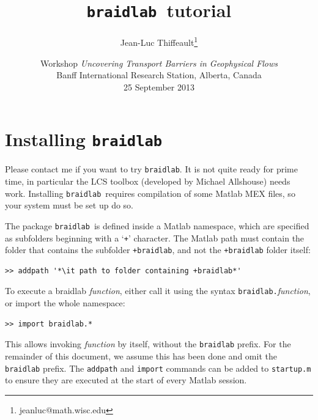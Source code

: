 \documentclass[12pt]{article}
\newcommand{\braidlab}{\texttt{braidlab}}%
\begin{document}
\lstset{language=Matlab}
\lstset{breaklines=true}

\lstset{%
basicstyle=\small\ttfamily,
keywordstyle=\small\ttfamily,
identifierstyle=,
commentstyle=\small\rmfamily\itshape,%
stringstyle=\small\ttfamily,
showstringspaces=false}


\title{\braidlab\ tutorial}
\author{Jean-Luc Thiffeault\thanks{jeanluc@math.wisc.edu}}
\date{Workshop {\it Uncovering Transport Barriers in Geophysical Flows}\\[2pt]
  Banff International Research Station, Alberta, Canada \\[4pt] 25 September 2013}
\maketitle

\section{Installing \braidlab}

Please contact me if you want to try \braidlab.  It is not quite ready for
prime time, in particular the LCS toolbox (developed by Michael Allshouse)
needs work.  Installing \braidlab\ requires compilation of some Matlab MEX
files, so your system must be set up do so.

The package \braidlab\ is defined inside a Matlab namespace, which are
specified as subfolders beginning with a `\lstinline{+}' character.  The Matlab
path must contain the folder that contains the subfolder
\lstinline{+braidlab}, and not the \lstinline{+braidlab} folder
itself:
\begin{lstlisting}[frame=single,framerule=0pt,escapechar=*]
>> addpath '*\it path to folder containing +braidlab*'
\end{lstlisting}
To execute a braidlab \textit{function}, either call it using the
syntax \hbox{\lstinline{braidlab.}\textit{function}}, or import the
whole namespace:
\begin{lstlisting}[frame=single,framerule=0pt]
>> import braidlab.*
\end{lstlisting}
This allows invoking \textit{function} by itself, without the
\lstinline{braidlab} prefix.  For the remainder of this document, we
assume this has been done and omit the \lstinline{braidlab} prefix.
The \lstinline{addpath} and \lstinline{import} commands can be added
to \lstinline{startup.m} to ensure they are executed at the start of
every Matlab session.
\end{document}
